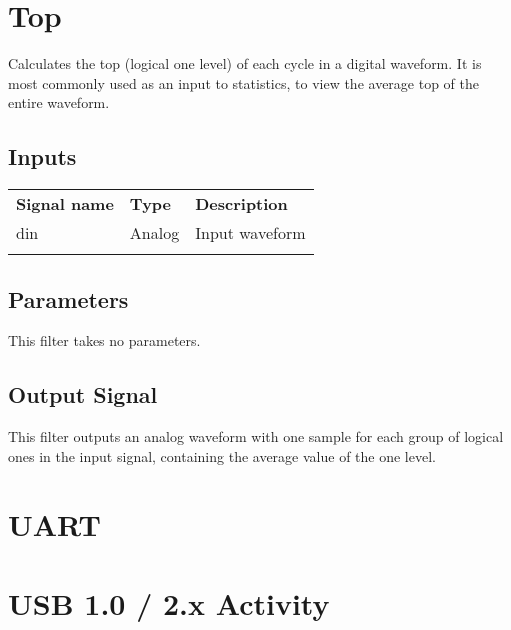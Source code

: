 \pagebreak
\section{Top}

Calculates the top (logical one level) of each cycle in a digital waveform. It is most commonly used as an input to
statistics, to view the average top of the entire waveform.

\subsection{Inputs}

\begin{tabularx}{16cm}{llX}
\thickhline
\textbf{Signal name} & \textbf{Type} & \textbf{Description} \\
\thickhline
din & Analog & Input waveform \\
\thickhline
\end{tabularx}

\subsection{Parameters}

This filter takes no parameters.

\subsection{Output Signal}

This filter outputs an analog waveform with one sample for each group of logical ones in the input signal, containing
the average value of the one level.

\pagebreak
\section{UART}

\pagebreak
\section{USB 1.0 / 2.x Activity}

\pagebreak
